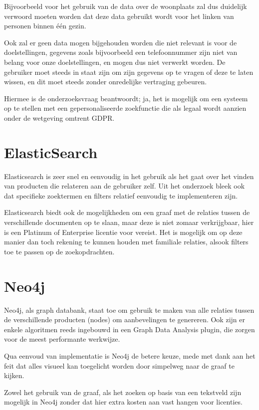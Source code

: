 Bijvoorbeeld voor het gebruik van de data over de woonplaats zal dus duidelijk verwoord moeten worden dat deze data gebruikt wordt voor het linken van personen binnen één gezin.

Ook zal er geen data mogen bijgehouden worden die niet relevant is voor de doelstellingen, gegevens zoals bijvoorbeeld een telefoonnummer zijn niet van belang voor onze doelstellingen, en mogen dus niet verwerkt worden. De gebruiker moet steeds in staat zijn om zijn gegevens op te vragen of deze te laten wissen, en dit moet steeds zonder onredelijke vertraging gebeuren.

Hiermee is de onderzoeksvraag beantwoordt; ja, het is mogelijk om een systeem op te stellen met een gepersonaliseerde zoekfunctie die als legaal wordt aanzien onder de wetgeving omtrent GDPR.

\section{ ElasticSearch}
\label{sec:Conclusie Elasticsearch}

Elasticsearch is zeer snel en eenvoudig in het gebruik als het gaat over het vinden van producten die relateren aan de gebruiker zelf. Uit het onderzoek bleek ook dat specifieke zoektermen en filters relatief eenvoudig te implementeren zijn.

Elasticsearch biedt ook de mogelijkheden om een graaf met de relaties tussen de verschillende documenten op te slaan, maar deze is niet zomaar verkrijgbaar, hier is een Platinum of Enterprise licentie voor vereist. Het is mogelijk om op deze manier dan toch rekening te kunnen houden met familiale relaties, alsook filters toe te passen op de zoekopdrachten.

\section{ Neo4j}
\label{sec:Conclusie Neo4j}

Neo4j, als graph databank, staat toe om gebruik te maken van alle relaties tussen de verschillende producten (nodes) om aanbevelingen te genereren. Ook zijn er enkele algoritmen reeds ingebouwd in een Graph Data Analysis plugin, die zorgen voor de meest performante werkwijze.

Qua eenvoud van implementatie is Neo4j de betere keuze, mede met dank aan het feit dat alles visueel kan toegelicht worden door simpelweg naar de graaf te kijken. 

Zowel het gebruik van de graaf, als het zoeken op basis van een tekstveld zijn mogelijk in Neo4j zonder dat hier extra kosten aan vast hangen voor licenties. 

